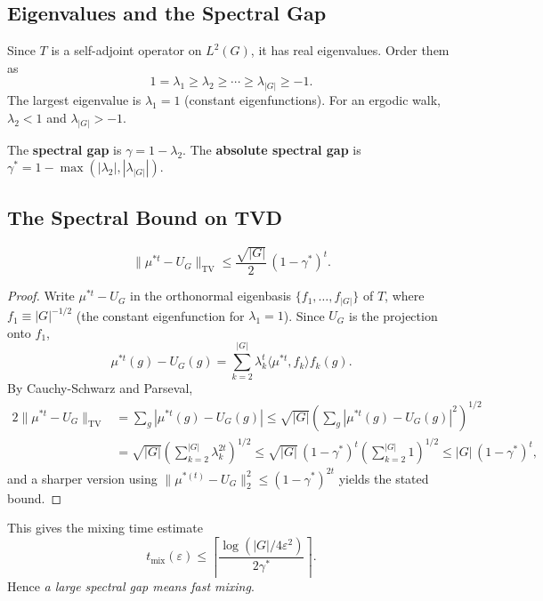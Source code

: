 \subsection{Eigenvalues and the Spectral Gap}

Since $T$ is a self-adjoint operator on $L^2(G)$, it has real eigenvalues.
Order them as
\[
  1 = \lambda_1 \geq \lambda_2 \geq \cdots \geq \lambda_{|G|} \geq -1.
\]
The largest eigenvalue is $\lambda_1 = 1$ (constant eigenfunctions).
For an ergodic walk, $\lambda_2 < 1$ and $\lambda_{|G|} > -1$.

\begin{definition}
The \textbf{spectral gap} is $\gamma = 1 - \lambda_2$.
The \textbf{absolute spectral gap} is $\gamma^* = 1 - \max(|\lambda_2|, |\lambda_{|G|}|)$.
\end{definition}

\subsection{The Spectral Bound on TVD}

\begin{theorem}
\[
  \|\mu^{*t} - U_G\|_{\mathrm{TV}} \leq \frac{\sqrt{|G|}}{2}\,(1 - \gamma^*)^t.
\]
\end{theorem}

\begin{proof}
Write $\mu^{*t} - U_G$ in the orthonormal eigenbasis $\{f_1, \ldots, f_{|G|}\}$ of $T$,
where $f_1 \equiv |G|^{-1/2}$ (the constant eigenfunction for $\lambda_1 = 1$).
Since $U_G$ is the projection onto $f_1$,
\[
  \mu^{*t}(g) - U_G(g) = \sum_{k=2}^{|G|} \lambda_k^t \langle \mu^{*t}, f_k \rangle f_k(g).
\]
By Cauchy-Schwarz and Parseval,
\begin{align*}
  2\|\mu^{*t} - U_G\|_{\mathrm{TV}}
  &= \sum_g |\mu^{*t}(g) - U_G(g)|
  \leq \sqrt{|G|} \left(\sum_g |\mu^{*t}(g) - U_G(g)|^2\right)^{1/2} \\
  &= \sqrt{|G|} \left(\sum_{k=2}^{|G|} \lambda_k^{2t}\right)^{1/2}
  \leq \sqrt{|G|}\,(1-\gamma^*)^t \left(\sum_{k=2}^{|G|} 1\right)^{1/2}
  \leq |G|\,(1-\gamma^*)^t,
\end{align*}
and a sharper version using $\|\mu^{*(t)} - U_G\|_2^2 \leq (1-\gamma^*)^{2t}$
yields the stated bound.
\end{proof}

This gives the mixing time estimate
\[
  t_{\mathrm{mix}}(\varepsilon) \leq \left\lceil \frac{\log(|G|/4\varepsilon^2)}{2\gamma^*} \right\rceil.
\]
Hence \emph{a large spectral gap means fast mixing}.

